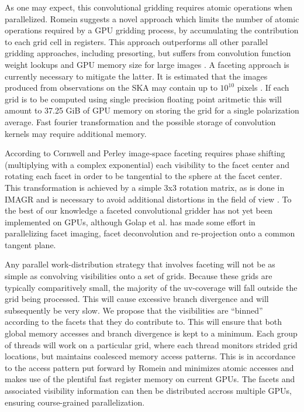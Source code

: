 \documentclass[a4paper, two column]{article}
\begin{document}
 As one may expect, this convolutional gridding requires atomic operations when parallelized. Romein \cite{romein2012efficient} suggests a novel approach which limits the number of atomic operations required by a GPU gridding process, by accumulating
 the contribution to each grid cell in registers. This approach outperforms all other parallel gridding approaches, including presorting, but suffers from convolution function weight lookups and GPU memory size for large images \cite{muscat2014high}.
 A faceting approach is currently necessary to mitigate the latter. It is estimated that the images produced from observations on the SKA may contain up to $10^{10}$ pixels \cite{cornwell2012wide}. If each grid is to be computed using single precision floating point
 aritmetic this will amount to 37.25 GiB of GPU memory on storing the grid for a single polarization average. Fast fourier transformation and the possible storage of convolution kernels may require additional memory. 
 
 According to Cornwell and Perley \cite{cornwell1992radio} image-space faceting requires phase shifting (multiplying with a complex exponential) each visibility to the facet center and rotating each facet in order to 
 be tangential to the sphere at the facet center. This transformation is achieved by a simple 3x3 rotation matrix, as is done in IMAGR \cite{AIPS113} and is necessary to avoid additional distortions in the field of view \cite[pg. 395]{taylor1999synthesis}. To the best of our knowledge 
 a faceted convolutional gridder has not yet been implemented on GPUs, although Golap et al. \cite{golap2001parallelization} has made some effort in parallelizing facet imaging, facet deconvolution and re-projection onto a common tangent plane.
 
 Any parallel work-distribution strategy that involves faceting will not be as simple as convolving visibilities onto a set of grids. Because these grids are typically comparitively small, the majority of the uv-coverage will fall outside the grid being processed. This will cause 
 excessive branch divergence and will subsequently be very slow. We propose that the visibilities are ``binned'' according to the facets that they do contribute to. This will ensure that both global memory accesses and branch divergence is kept to a minimum. Each group of threads will
 work on a particular grid, where each thread monitors strided grid locations, but maintains coalesced memory access patterns. This is in accordance to the access pattern put forward by Romein \cite{romein2012efficient} and minimizes atomic accesses and makes use of the plentiful fast 
 register memory on current GPUs. The facets and associated visibility information can then be distributed accross multiple GPUs, ensuring course-grained parallelization.
\end{document}
